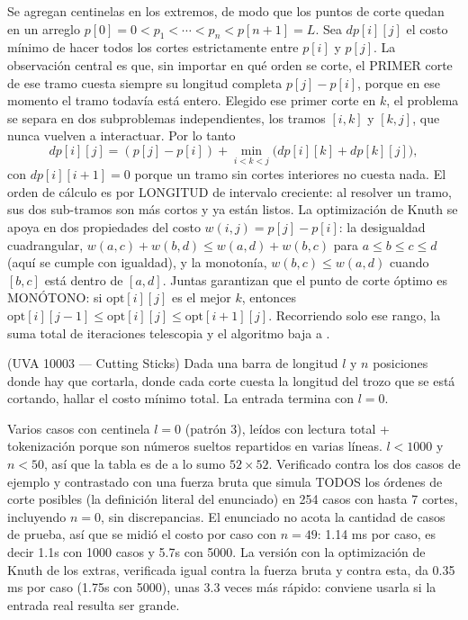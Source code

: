  Se agregan centinelas en los extremos, de modo que los puntos de corte quedan en un arreglo $p[0] = 0 < p_1 < \cdots < p_n < p[n+1] = L$. Sea $dp[i][j]$ el costo mínimo de hacer todos los cortes estrictamente entre $p[i]$ y $p[j]$. La observación central es que, sin importar en qué orden se corte, el PRIMER corte de ese tramo cuesta siempre su longitud completa $p[j] - p[i]$, porque en ese momento el tramo todavía está entero. Elegido ese primer corte en $k$, el problema se separa en dos subproblemas independientes, los tramos $[i,k]$ y $[k,j]$, que nunca vuelven a interactuar. Por lo tanto
\[dp[i][j] = (p[j] - p[i]) + \min_{i<k<j}\big(dp[i][k] + dp[k][j]\big),\]
con $dp[i][i+1] = 0$ porque un tramo sin cortes interiores no cuesta nada. El orden de cálculo es por LONGITUD de intervalo creciente: al resolver un tramo, sus dos sub-tramos son más cortos y ya están listos. La optimización de Knuth se apoya en dos propiedades del costo $w(i,j) = p[j] - p[i]$: la desigualdad cuadrangular, $w(a,c) + w(b,d) \le w(a,d) + w(b,c)$ para $a \le b \le c \le d$ (aquí se cumple con igualdad), y la monotonía, $w(b,c) \le w(a,d)$ cuando $[b,c]$ está dentro de $[a,d]$. Juntas garantizan que el punto de corte óptimo es MONÓTONO: si $\mathrm{opt}[i][j]$ es el mejor $k$, entonces $\mathrm{opt}[i][j-1] \le \mathrm{opt}[i][j] \le \mathrm{opt}[i+1][j]$. Recorriendo solo ese rango, la suma total de iteraciones telescopia y el algoritmo baja a .~\cite{knuth1971}


(UVA 10003 — Cutting Sticks) Dada una barra de longitud $l$ y $n$ posiciones donde hay que cortarla, donde cada corte cuesta la longitud del trozo que se está cortando, hallar el costo mínimo total. La entrada termina con $l = 0$.

 Varios casos con centinela $l = 0$ (patrón 3), leídos con lectura total + tokenización porque son números sueltos repartidos en varias líneas. $l < 1000$ y $n < 50$, así que la tabla es de a lo sumo $52\times52$. Verificado contra los dos casos de ejemplo y contrastado con una fuerza bruta que simula TODOS los órdenes de corte posibles (la definición literal del enunciado) en 254 casos con hasta 7 cortes, incluyendo $n = 0$, sin discrepancias. El enunciado no acota la cantidad de casos de prueba, así que se midió el costo por caso con $n = 49$: \aprox{}1.14 ms por caso, es decir \aprox{}1.1s con 1000 casos y \aprox{}5.7s con 5000. La versión con la optimización de Knuth de los extras, verificada igual contra la fuerza bruta y contra esta, da \aprox{}0.35 ms por caso (\aprox{}1.75s con 5000), unas 3.3 veces más rápido: conviene usarla si la entrada real resulta ser grande.

